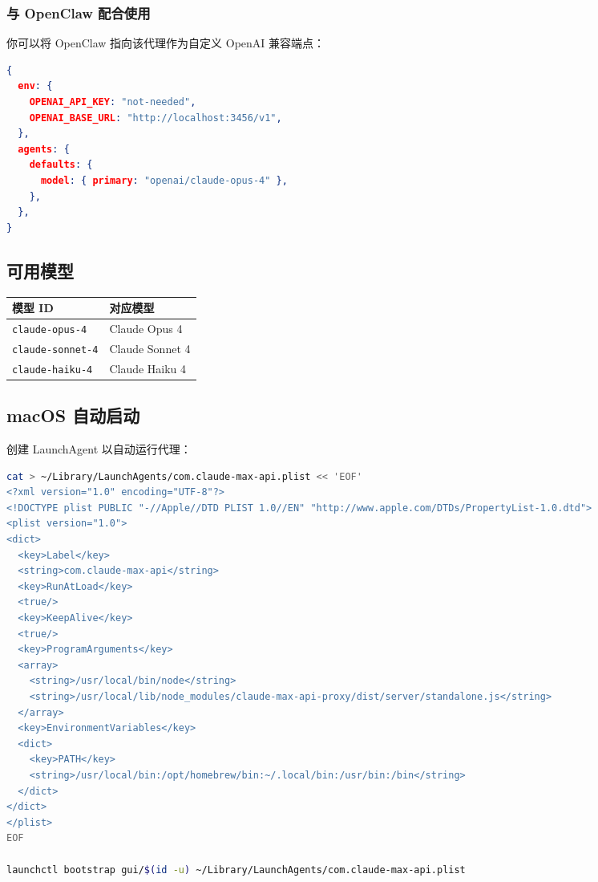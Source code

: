 \subsubsection{与 OpenClaw 配合使用}


你可以将 OpenClaw 指向该代理作为自定义 OpenAI 兼容端点：

\begin{lstlisting}[language=json]
{
  env: {
    OPENAI_API_KEY: "not-needed",
    OPENAI_BASE_URL: "http://localhost:3456/v1",
  },
  agents: {
    defaults: {
      model: { primary: "openai/claude-opus-4" },
    },
  },
}
\end{lstlisting}


\subsection{可用模型}



\begin{table}[h]
\centering
\small
\begin{tabular}{|l|l|}
\hline
模型 ID & 对应模型 \\
\hline
\texttt{claude-opus-4} & Claude Opus 4 \\
\hline
\texttt{claude-sonnet-4} & Claude Sonnet 4 \\
\hline
\texttt{claude-haiku-4} & Claude Haiku 4 \\
\hline
\end{tabular}
\end{table}



\subsection{macOS 自动启动}


创建 LaunchAgent 以自动运行代理：

\begin{lstlisting}[language=bash]
cat > ~/Library/LaunchAgents/com.claude-max-api.plist << 'EOF'
<?xml version="1.0" encoding="UTF-8"?>
<!DOCTYPE plist PUBLIC "-//Apple//DTD PLIST 1.0//EN" "http://www.apple.com/DTDs/PropertyList-1.0.dtd">
<plist version="1.0">
<dict>
  <key>Label</key>
  <string>com.claude-max-api</string>
  <key>RunAtLoad</key>
  <true/>
  <key>KeepAlive</key>
  <true/>
  <key>ProgramArguments</key>
  <array>
    <string>/usr/local/bin/node</string>
    <string>/usr/local/lib/node_modules/claude-max-api-proxy/dist/server/standalone.js</string>
  </array>
  <key>EnvironmentVariables</key>
  <dict>
    <key>PATH</key>
    <string>/usr/local/bin:/opt/homebrew/bin:~/.local/bin:/usr/bin:/bin</string>
  </dict>
</dict>
</plist>
EOF

launchctl bootstrap gui/$(id -u) ~/Library/LaunchAgents/com.claude-max-api.plist
\end{lstlisting}


